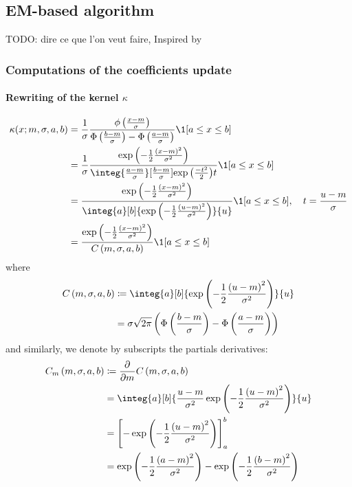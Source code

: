 \subsection{EM-based algorithm}

TODO: dire ce que l'on veut faire, Inspired by \cite{lewis2011nonparametric, xu2016learning}

\subsubsection{Computations of the coefficients update}

\paragraph{Rewriting of the kernel $\kappa$}
\begin{align*}
    \kappa(x ; m, \sigma, a, b) &= \frac{1}{\sigma} \frac{\phi\pars{\frac{x-m}{\sigma}}}{\Phi\pars{\frac{b-m}{\sigma}} - \Phi\pars{\frac{a-m}{\sigma}}} \1[a\leq x\leq b] \\
    &= \frac{1}{\sigma} \frac{\e{-\frac{1}{2} \frac{\pars{x-m}^2}{\sigma^2}}}{\integ{\frac{a-m}{\sigma}}[\frac{b-m}{\sigma}]{\e{\frac{-t^2}{2}}}{t}} \1[a\leq x\leq b] \\
    &= \frac{\e{-\frac{1}{2}\frac{\pars{x-m}^2}{\sigma^2}}}{\integ{a}[b]{\e{-\frac{1}{2}\frac{\pars{u-m}^2}{\sigma^2}}}{u}} \1[a\leq x\leq b], \quad t = \frac{u-m}{\sigma} \\
    &= \frac{\e{-\frac{1}{2}\frac{\pars{x-m}^2}{\sigma^2}}}{C\pars{m,\sigma,a,b}} \1[a\leq x\leq b]
\end{align*}
where 
\begin{align*}
    C\pars{m,\sigma,a,b} &\coloneqq \integ{a}[b]{\e{-\frac{1}{2}\frac{\pars{u-m}^2}{\sigma^2}}}{u} \\
    &= \sigma\sqrt{2\pi}\pars{\Phi\pars{\frac{b-m}{\sigma}} - \Phi\pars{\frac{a-m}{\sigma}}}
\end{align*}
and similarly, we denote by subscripts the partials derivatives:
\begin{align*}
    C_m\pars{m,\sigma,a,b} &\coloneqq \partiald{}{m} C\pars{m,\sigma,a,b} \\
    &= \integ{a}[b]{\frac{u-m}{\sigma^2}\e{-\frac{1}{2}\frac{\pars{u-m}^2}{\sigma^2}}}{u} \\
    &= \bracks{-\e{-\frac{1}{2}\frac{\pars{u-m}^2}{\sigma^2}}}_{a}^b \\
    &= \e{-\frac{1}{2}\frac{\pars{a-m}^2}{\sigma^2}} - \e{-\frac{1}{2}\frac{\pars{b-m}^2}{\sigma^2}}
\end{align*}
